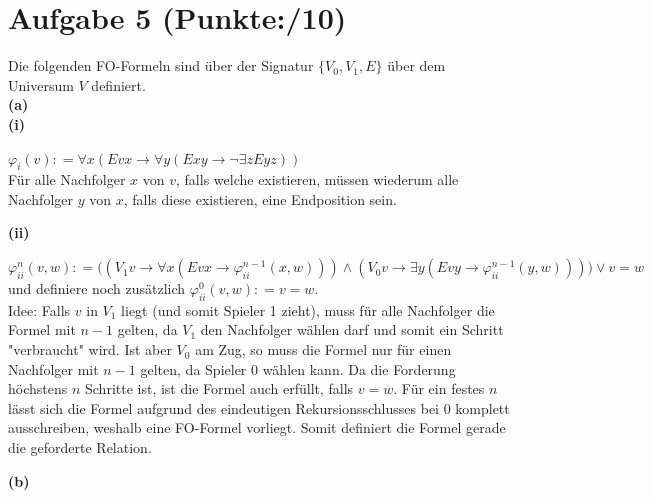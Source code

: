 \documentclass[11pt, a4paper]{article}
\newcommand{\pppp}{10}
\newcommand{\defgr}{\mathrel{\mathop:\!\!=}}
\begin{document}
\section*{Aufgabe 5 (Punkte:\qquad/\pppp)}
Die folgenden FO-Formeln sind über der Signatur $\{ V_0,V_1,E\}$ über dem Universum $V$ definiert. \\
\textbf{(a)}\\
\textbf{(i)}\vspace{-\baselineskip}
\begin{adjustwidth}{20pt}{20pt}
$\varphi_i(v)\defgr \forall x(Evx \rightarrow \forall y(Exy \rightarrow \neg\exists zEyz))$\\
Für alle Nachfolger $x$ von $v$, falls welche existieren, müssen wiederum alle Nachfolger $y$ von $x$, falls diese existieren, eine Endposition sein.\\
\end{adjustwidth}
\textbf{(ii)}\vspace{-\baselineskip}
\begin{adjustwidth}{20pt}{20pt}
$\varphi^n_{ii}(v,w)\defgr \Big((V_1v \rightarrow \forall x(Evx \rightarrow \varphi^{n-1}_{ii}(x,w))) \wedge (V_0v \rightarrow \exists y(Evy \rightarrow \varphi^{n-1}_{ii}(y,w)))\Big) \vee v=w$ und definiere
noch zusätzlich $\varphi^0_{ii}(v,w) \defgr v = w$.\\
Idee: Falls $v$ in $V_1$ liegt (und somit Spieler 1 zieht), muss für alle Nachfolger die Formel mit $n-1$ gelten, da $V_1$ den Nachfolger wählen darf und somit ein Schritt "verbraucht" wird.
Ist aber $V_0$ am Zug, so muss die Formel nur für einen Nachfolger mit $n-1$ gelten, da Spieler 0 wählen kann. Da die Forderung höchstens $n$ Schritte ist, ist die Formel auch erfüllt, falls
$v=w$. Für ein festes $n$ lässt sich die Formel aufgrund des eindeutigen Rekursionsschlusses bei 0 komplett ausschreiben, weshalb eine FO-Formel vorliegt. Somit definiert die Formel
gerade die geforderte Relation. 
\end{adjustwidth}
\textbf{(b)}
\end{document}
